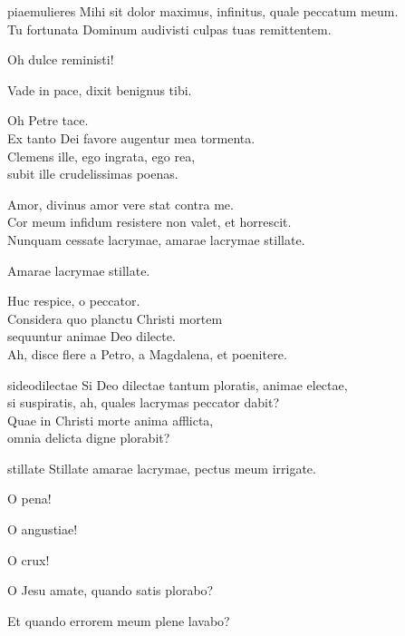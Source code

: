 \documentclass[tocstyle=ref-genre]{ees}
\begin{document}
{\begin{movement}{piaemulieres}
  \voice[Petrus]
  Mihi sit dolor maximus, infinitus, quale peccatum meum.\\
  Tu fortunata Dominum audivisti culpas tuas remittentem.

  \voice[M. Magdalena]
  Oh dulce reministi!

  \voice[Petrus]
  Vade in pace, dixit benignus tibi.

  \voice[M. Magdalena]
  Oh Petre tace.\\
  Ex tanto Dei favore augentur mea tormenta.\\
  Clemens ille, ego ingrata, ego rea,\\
  subit ille crudelissimas poenas.

  \voice[Petrus]
  Amor, divinus amor vere stat contra me.\\
  Cor meum infidum resistere non valet, et horrescit.\\
  Nunquam cessate lacrymae, amarae lacrymae stillate.

  \voice[M. Magdalena]
  Amarae lacrymae stillate.

  Huc respice, o peccator.\\
  Considera quo planctu Christi mortem\\
  sequuntur animae Deo dilecte.\\
  Ah, disce flere a Petro, a Magdalena, et poenitere.
\end{movement}

\begin{movement}{sideodilectae}
  Si Deo dilectae tantum ploratis, animae electae,\\
  si suspiratis, ah, quales lacrymas peccator dabit?\\
  Quae in Christi morte anima afflicta,\\
  omnia delicta digne plorabit?
\end{movement}

\begin{movement}{stillate}
  \voice[M. Magdalena]
  Stillate amarae lacrymae, pectus meum irrigate.

  \voice[Petrus]
  O pena!

  \voice[M. Magdalena]
  O angustiae!

  \voice[Petrus]
  O crux!

  \voice[M. Magdalena]
  O Jesu amate, quando satis plorabo?

  \voice[Petrus]
  Et quando errorem meum plene lavabo?
\end{movement}

}
\end{document}
